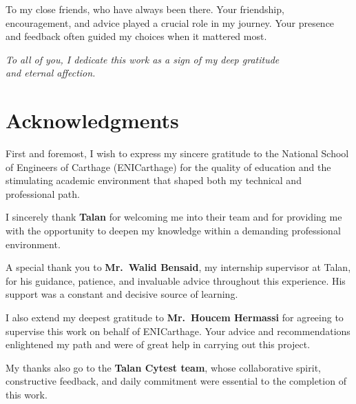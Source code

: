 \documentclass[12pt,a4paper]{report}
\begin{document}
To my close friends, who have always been there. Your friendship, encouragement,
and advice played a crucial role in my journey. Your presence and feedback
often guided my choices when it mattered most.

\vspace{1.4cm}

\begin{flushright}
\itshape
To all of you, I dedicate this work as a sign of my deep gratitude\\
and eternal affection.
\end{flushright}

\newpage
\thispagestyle{fancy}
\section*{Acknowledgments}

\vspace{1cm}

First and foremost, I wish to express my sincere gratitude to the National School
of Engineers of Carthage (ENICarthage) for the quality of education and the
stimulating academic environment that shaped both my technical and professional path.

\vspace{0.9cm}

I sincerely thank \textbf{Talan} for welcoming me into their team and for providing
me with the opportunity to deepen my knowledge within a demanding professional
environment.

\vspace{0.9cm}

A special thank you to \textbf{Mr.\ Walid Bensaid}, my internship supervisor at Talan,
for his guidance, patience, and invaluable advice throughout this experience.
His support was a constant and decisive source of learning.

\vspace{0.9cm}

I also extend my deepest gratitude to \textbf{Mr.\ Houcem Hermassi} for agreeing
to supervise this work on behalf of ENICarthage. Your advice and recommendations
enlightened my path and were of great help in carrying out this project.

\vspace{0.9cm}

My thanks also go to the \textbf{Talan Cytest team}, whose collaborative spirit,
constructive feedback, and daily commitment were essential to the completion
of this work.
\end{document}
